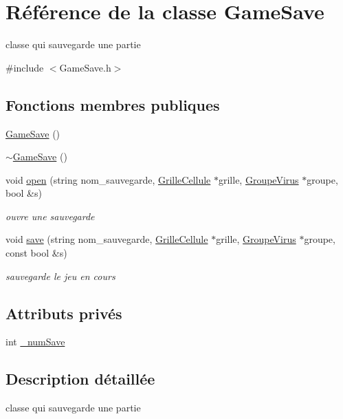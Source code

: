 \hypertarget{classGameSave}{
\section{Référence de la classe GameSave}
\label{classGameSave}
}


classe qui sauvegarde une partie  




{\ttfamily \#include $<$GameSave.h$>$}

\subsection*{Fonctions membres publiques}
\begin{DoxyCompactItemize}
\item 
\hyperlink{classGameSave_ace2a7eecd0b6e461047ed454db52c15d}{GameSave} ()
\item 
\hyperlink{classGameSave_ae3ae584d2d6fb74af8e5656b8f403fbd}{$\sim$GameSave} ()
\item 
void \hyperlink{classGameSave_ab3f1184bd835d692e43b476c2a1e17ef}{open} (string nom\_\-sauvegarde, \hyperlink{classGrilleCellule}{GrilleCellule} $\ast$grille, \hyperlink{classGroupeVirus}{GroupeVirus} $\ast$groupe, bool \&s)
\begin{DoxyCompactList}\small\item\em ouvre une sauvegarde \end{DoxyCompactList}\item 
void \hyperlink{classGameSave_a945bc41ac7478310c7efd95242d2e6ac}{save} (string nom\_\-sauvegarde, \hyperlink{classGrilleCellule}{GrilleCellule} $\ast$grille, \hyperlink{classGroupeVirus}{GroupeVirus} $\ast$groupe, const bool \&s)
\begin{DoxyCompactList}\small\item\em sauvegarde le jeu en cours \end{DoxyCompactList}\end{DoxyCompactItemize}
\subsection*{Attributs privés}
\begin{DoxyCompactItemize}
\item 
int \hyperlink{classGameSave_a4d8d919bdbe2b6a4d77214ef066b6cc1}{\_\-numSave}
\end{DoxyCompactItemize}


\subsection{Description détaillée}
classe qui sauvegarde une partie 

